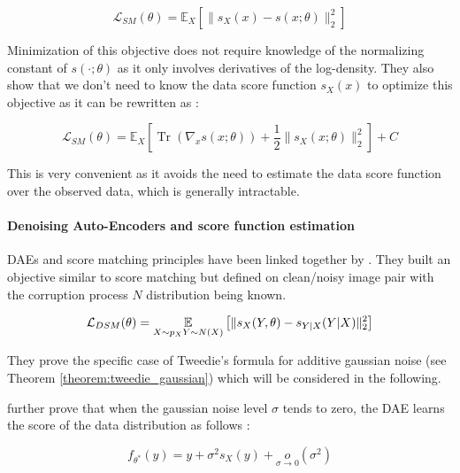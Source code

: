 \begin{equation}
    \mathcal{L}_{SM}(\theta) = \mathbb{E}_X \left[ \| s_X(x) - s(x; \theta) \|_2^2 \right]
\end{equation}

Minimization of this objective does not require knowledge of the normalizing constant of $s(\cdot; \theta)$ as it only involves derivatives of the log-density.
They also show that we don't need to know the data score function $s_X(x)$ to optimize this objective as it can be rewritten as :

\begin{equation}
    \mathcal{L}_{SM}(\theta) = \mathbb{E}_X \left[ \mathop{Tr} \left( \nabla_x s(x; \theta) \right) + \frac{1}{2} \| s_X(x; \theta) \|_2^2 \right] + C
\end{equation}

This is very convenient as it avoids the need to estimate the data score function over the observed data, which is generally intractable.

\paragraph{Denoising Auto-Encoders and score function estimation}




DAEs and score matching principles have been linked together by \cite{vincent_connection_2011}. They built an objective similar to score matching but defined on clean/noisy image pair with the corruption process $N$ distribution being known.

\begin{equation}
    \mathcal{L}_{DSM}(\theta) = \underset{X \sim p_X \\ Y \sim N(X)}{\mathbb{E}} \left[ \| s_X(Y, \theta) - s_{Y|X}(Y|X) \|_2^2 \right]
\end{equation}

They prove the specific case of Tweedie's formula for additive gaussian noise (see Theorem \ref{theorem:tweedie_gaussian}) which will be considered in the following.

\cite{alain_what_2014} further prove that when the gaussian noise level $\sigma$ tends to zero, the DAE learns the score of the data distribution as follows :

\begin{equation}
    f_{\theta^*}(y) = y + \sigma^2 s_X(y) + \underset{\sigma \to 0}{o}(\sigma^2)
\end{equation}

